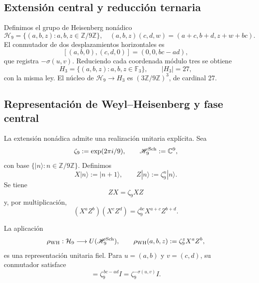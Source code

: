 \subsection{Extensión central y reducción ternaria}

Definimos el grupo de Heisenberg nonádico
\begin{equation}
 \mathcal H_9=\{(a,b,z):a,b,z\in\mathbb Z/9\mathbb Z\},
 \quad
 (a,b,z)(c,d,w)=(a+c,b+d,z+w+bc).
 \label{x_reciprocidad:p12-83-c20-s6:eq:heisenberg-9-nuevo}
\end{equation}
El conmutador de dos desplazamientos horizontales es
\[
 [(a,b,0),(c,d,0)]=(0,0,bc-ad),
\]
que registra \(-\sigma(u,v)\). Reduciendo cada coordenada módulo tres se
obtiene
\begin{equation}
 H_3=\{(a,b,z):a,b,z\in\mathbb F_3\},\qquad |H_3|=27,
 \label{x_reciprocidad:p12-83-c20-s6:eq:heisenberg-3-nuevo}
\end{equation}
con la misma ley. El núcleo de
\(\mathcal H_9\to H_3\) es
\((3\mathbb Z/9\mathbb Z)^3\), de cardinal 27.

\subsection{Representación de Weyl--Heisenberg y fase central}

La extensión nonádica admite una realización unitaria explícita. Sea
\[
 \zeta_9:=\exp(2\pi i/9),
 \qquad
 \mathscr H_9^{\rm Sch}:=\mathbb C^9,
\]
con base \(\{|n\rangle:n\in\mathbb Z/9\mathbb Z\}\). Definimos
\begin{equation}
 X|n\rangle:=|n+1\rangle,
 \qquad
 Z|n\rangle:=\zeta_9^n|n\rangle.
 \label{x_reciprocidad:p12-83-c20-s6:eq:weyl-desplazamiento-fase-u029}
\end{equation}
Se tiene
\[
 ZX=\zeta_9XZ
\]
y, por multiplicación,
\begin{equation}
 (X^aZ^b)(X^cZ^d)
 =\zeta_9^{bc}X^{a+c}Z^{b+d}.
 \label{x_reciprocidad:p12-83-c20-s6:eq:cociclo-weyl-nonadico-u029}
\end{equation}

\begin{theorem}
\label{x_reciprocidad:p12-83-c20-s6:thm:representacion-weyl-heisenberg-u029}
La aplicación
\begin{equation}
 \rho_{\rm WH}:\mathcal H_9\longrightarrow
 U(\mathscr H_9^{\rm Sch}),
 \qquad
 \rho_{\rm WH}(a,b,z):=\zeta_9^zX^aZ^b,
 \label{x_reciprocidad:p12-83-c20-s6:eq:representacion-weyl-heisenberg-u029}
\end{equation}
es una representación unitaria fiel. Para
\(u=(a,b)\) y \(v=(c,d)\), su conmutador satisface
\begin{equation}
 [\rho_{\rm WH}(u,0),\rho_{\rm WH}(v,0)]
 =\zeta_9^{\,bc-ad}I
 =\zeta_9^{-\sigma(u,v)}I.
 \label{x_reciprocidad:p12-83-c20-s6:eq:conmutador-weyl-holonomia-u029}
\end{equation}
\end{theorem}

